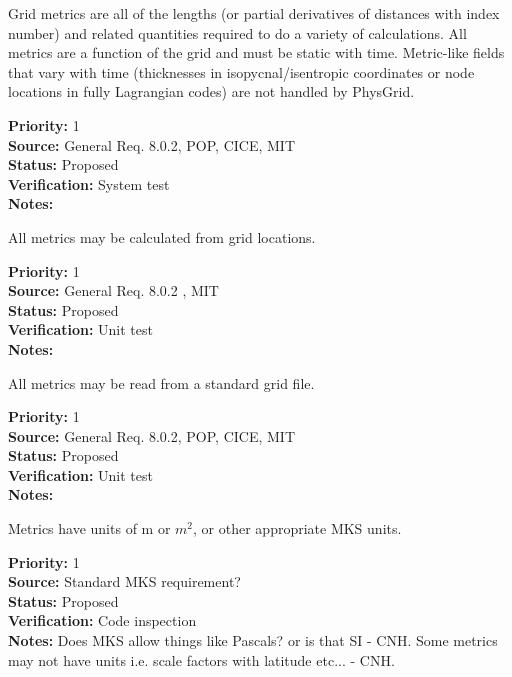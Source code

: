Grid metrics are all of the lengths (or partial derivatives of distances with
index number) and related quantities required to do a variety of calculations. 
All metrics are a function of the grid and must be static with time.  Metric-like
fields that vary with time (thicknesses in isopycnal/isentropic coordinates
or node locations in fully Lagrangian codes) are not handled by PhysGrid.
\begin{reqlist}
{\bf Priority:} 1 \\
{\bf Source:} General Req. 8.0.2, POP, CICE, MIT \\
{\bf Status:} Proposed \\
{\bf Verification:} System test\\
{\bf Notes:} 
\end{reqlist}

All metrics may be calculated from grid locations.
\begin{reqlist}
{\bf Priority:} 1 \\
{\bf Source:} General Req. 8.0.2 , MIT\\
{\bf Status:} Proposed \\
{\bf Verification:} Unit test\\
{\bf Notes:} 
\end{reqlist}

All metrics may be read from a standard grid file.
\begin{reqlist}
{\bf Priority:} 1 \\
{\bf Source:} General Req. 8.0.2, POP, CICE, MIT \\
{\bf Status:} Proposed \\
{\bf Verification:} Unit test\\
{\bf Notes:} 
\end{reqlist}

Metrics have units of m or $m^2$, or other appropriate MKS units.
\begin{reqlist}
{\bf Priority:} 1 \\
{\bf Source:} Standard MKS requirement? \\
{\bf Status:} Proposed \\
{\bf Verification:} Code inspection \\
{\bf Notes:} Does MKS allow things like Pascals? or is that SI - CNH.
Some metrics may not have units i.e. scale factors with latitude etc... - CNH.
\end{reqlist}

